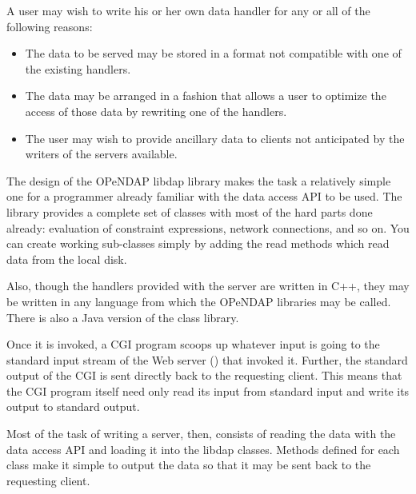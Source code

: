 \documentclass{dods-book}
\begin{document}
A user may wish to write his or her own data handler for any or all of
the following reasons:

\begin{itemize}
  
\item The data to be served may be stored in a format not compatible
  with one of the existing handlers.
  
\item The data may be arranged in a fashion that allows a user to
  optimize the access of those data by rewriting one of the handlers.
  
\item The user may wish to provide ancillary data to clients not
  anticipated by the writers of the servers available.

\end{itemize}

The design of the OPeNDAP libdap library makes the task a relatively
simple one for a programmer already familiar with the data access API
to be used. The library provides a complete set of classes with most
of the hard parts done already: evaluation of constraint expressions,
network connections, and so on. You can create working sub-classes
simply by adding the read methods which read data from the local disk.

Also, though the handlers provided with the server are written in C++,
they may be written in any language from which the OPeNDAP libraries
may be called. There is also a Java version of the class library.

Once it is invoked, a CGI program scoops up whatever input is going to the
standard input stream of the Web server () that invoked it.
Further, the standard output of the CGI is sent directly back to the
requesting client. This means that the CGI program itself need only read its
input from standard input and write its output to standard output.

Most of the task of writing a server, then, consists of reading the
data with the data access API and loading it into the libdap classes.
Methods defined for each class make it simple to output the data so
that it may be sent back to the requesting client.
\end{document}
